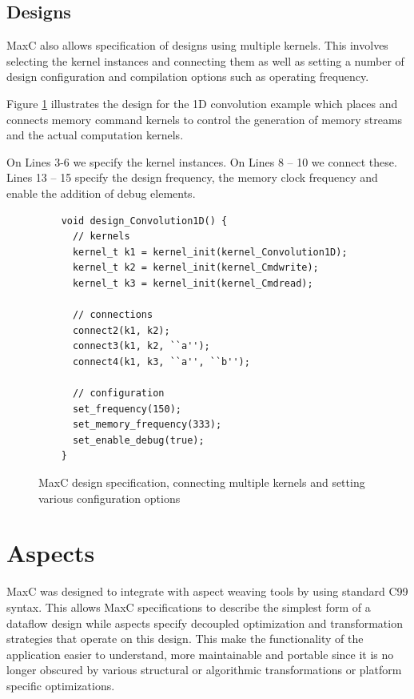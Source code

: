 \subsection{Designs}

MaxC also allows specification of designs using multiple kernels. This
involves selecting the kernel instances and connecting them as well as
setting a number of design configuration and compilation options such
as operating frequency.

Figure \ref{lst:maxc-design} illustrates the design for the 1D
convolution example which places and connects memory command kernels
to control the generation of memory streams and the actual computation
kernels.

On Lines 3-6 we specify the kernel instances. On Lines 8 -- 10 we
connect these. Lines 13 -- 15 specify the design frequency, the memory
clock frequency and enable the addition of debug elements.

\begin{figure}[!h]
  \centering
  \begin{lstlisting}
    void design_Convolution1D() {
      // kernels
      kernel_t k1 = kernel_init(kernel_Convolution1D);
      kernel_t k2 = kernel_init(kernel_Cmdwrite);
      kernel_t k3 = kernel_init(kernel_Cmdread);

      // connections
      connect2(k1, k2);
      connect3(k1, k2, ``a'');
      connect4(k1, k3, ``a'', ``b'');

      // configuration
      set_frequency(150);
      set_memory_frequency(333);
      set_enable_debug(true);
    }
  \end{lstlisting}
  \caption{MaxC design specification, connecting multiple kernels and
    setting various configuration options}
  \label{lst:maxc-design}
\end{figure}


\section{Aspects}

MaxC was designed to integrate with aspect weaving tools by using
standard C99 syntax. This allows MaxC specifications to describe the
simplest form of a dataflow design while aspects specify decoupled
optimization and transformation strategies that operate on this
design. This make the functionality of the application easier to
understand, more maintainable and portable since it is no longer
obscured by various structural or algorithmic transformations or
platform specific optimizations.

